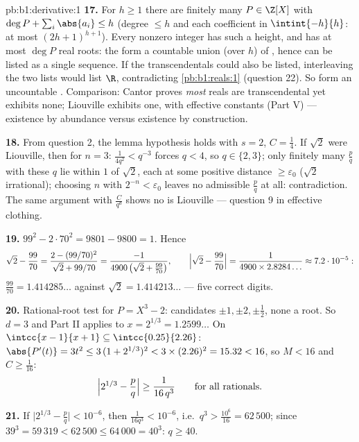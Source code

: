 \begin{solution}{pb:b1:derivative:1}
\textbf{17.} For $h \geq 1$ there are finitely many $P \in
\Z[X]$ with $\deg P + \sum_i \abs{a_i} \leq h$ (degree $\leq h$
and each coefficient in $\intint{-h}{h}$: at most
$(2h+1)^{h+1}$). Every nonzero integer  has such a
height, and has at most $\deg P$ real roots: the  form a countable union (over $h$) of , hence
can be listed as a single sequence. If the transcendentals could
also be listed, interleaving the two lists would list $\R$,
contradicting \cref{pb:b1:reals:1} (question 22). So
 form an uncountable . Comparison:
Cantor proves \emph{most} reals are transcendental yet exhibits
none; Liouville exhibits one, with effective constants (Part V)
--- existence by abundance versus existence by construction.

\textbf{18.} From question 2, the lemma hypothesis holds with $s
= 2$, $C = \frac14$. If $\sqrt2$ were Liouville, then for $n =
3$: $\frac{1}{4q^2} < q^{-3}$ forces $q < 4$, so $q \in \{2,
3\}$; only finitely many $\frac pq$ with these $q$ lie within
$1$ of $\sqrt2$, each at some positive distance
$\geq \varepsilon_0$ ($\sqrt2$ irrational); choosing $n$ with
$2^{-n} < \varepsilon_0$ leaves no admissible $\frac pq$ at all:
contradiction. The same argument with $\frac{C}{q^d}$ shows no
 is Liouville --- question 9 in effective
clothing.

\textbf{19.} $99^2 - 2\cdot70^2 = 9801 - 9800 = 1$. Hence
\[
\sqrt2 - \frac{99}{70} =
\frac{2 - (99/70)^2}{\sqrt2 + 99/70}
= \frac{-1}{4900\,\bigl(\sqrt2 + \tfrac{99}{70}\bigr)} ,
\qquad
\Bigl|\sqrt2 - \frac{99}{70}\Bigr|
= \frac{1}{4900 \times 2.8284\dots} \approx 7.2\cdot10^{-5} :
\]
$\frac{99}{70} = 1.414285\dots$ against $\sqrt2 =
1.414213\dots$ --- five correct digits.

\textbf{20.} Rational-root test for $P = X^3 - 2$: candidates
$\pm1, \pm2, \pm\frac12$, none a root. So $d = 3$ and Part II
applies to $x = 2^{1/3} = 1.2599\dots$ On $\intcc{x - 1}{x + 1}
\subseteq \intcc{0.25}{2.26}$: $\abs{P'(t)} = 3t^2 \leq 3\,(1 +
2^{1/3})^2 < 3\times(2.26)^2 = 15.32 < 16$, so $M < 16$ and $C
\geq \frac{1}{16}$:
\[
\Bigl|2^{1/3} - \frac pq\Bigr| \geq \frac{1}{16\,q^3}
\qquad\text{for all rationals.}
\]

\textbf{21.} If $\bigl|2^{1/3} - \frac pq\bigr| < 10^{-6}$, then
$\frac{1}{16 q^3} < 10^{-6}$, i.e.\ $q^3 > \frac{10^6}{16} =
62\,500$; since $39^3 = 59\,319 < 62\,500 \leq 64\,000 = 40^3$:
$q \geq 40$.


\end{solution}
